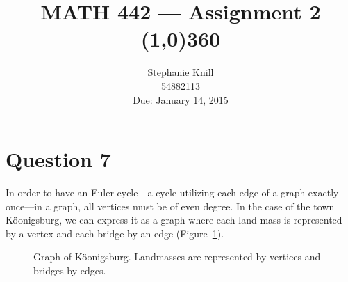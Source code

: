 \documentclass[11pt, oneside]{article}   	%
\begin{document}
\title{MATH 442 --- Assignment 2 \\
\line(1,0){360} \\              %
}
\author{
Stephanie Knill \\
54882113 \\
Due: January 14, 2015}

\date{}                   %
\maketitle


\thispagestyle{empty}                   %


\section*{Question 7}

In order to have an Euler cycle---a cycle utilizing each edge of a graph exactly once---in a graph, all vertices must be of even degree. In the case of the town K{\"o}onigsburg, we can express it as a graph where each land mass is represented by a vertex and each bridge by an edge (Figure~\ref{original}).

\begin{figure}[h]

\centering
\caption{Graph of K{\"o}onigsburg. Landmasses are represented by vertices and bridges by edges.}
\label{original}
\end{figure}
\end{document}
